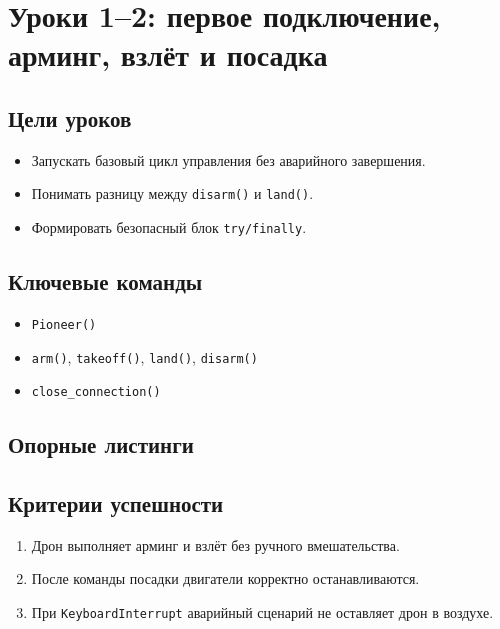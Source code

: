 \section{Уроки 1--2: первое подключение, арминг, взлёт и посадка}

\subsection{Цели уроков}
\begin{itemize}
\item Запускать базовый цикл управления без аварийного завершения.
\item Понимать разницу между \texttt{disarm()} и \texttt{land()}.
\item Формировать безопасный блок \texttt{try/finally}.
\end{itemize}

\subsection{Ключевые команды}
\begin{itemize}
\item \texttt{Pioneer()}
\item \texttt{arm()}, \texttt{takeoff()}, \texttt{land()}, \texttt{disarm()}
\item \texttt{close\_connection()}
\end{itemize}

\subsection{Опорные листинги}



\subsection{Критерии успешности}
\begin{enumerate}
\item Дрон выполняет арминг и взлёт без ручного вмешательства.
\item После команды посадки двигатели корректно останавливаются.
\item При \texttt{KeyboardInterrupt} аварийный сценарий не оставляет дрон в воздухе.
\end{enumerate}

